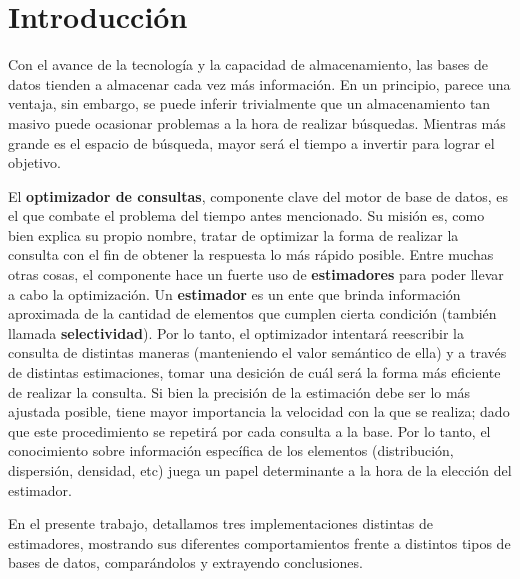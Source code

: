 \section{Introducción}


Con el avance de la tecnología y la capacidad de almacenamiento, las bases de datos tienden a almacenar cada vez más información. En un principio, parece una ventaja, sin embargo, se puede inferir trivialmente que un almacenamiento tan masivo puede ocasionar problemas a la hora de realizar búsquedas. Mientras más grande es el espacio de búsqueda, mayor será el tiempo a invertir para lograr el objetivo.

El \textbf{optimizador de consultas}, componente clave del motor de base de datos, es el que combate el problema del tiempo antes mencionado. Su misión es, como bien explica su propio nombre, tratar de optimizar la forma de realizar la consulta con el fin de obtener la respuesta lo más rápido posible. Entre muchas otras cosas, el componente hace un fuerte uso de \textbf{estimadores} para poder llevar a cabo la optimización. Un \textbf{estimador} es un {\Huge ente} que brinda información aproximada de la cantidad de elementos que cumplen cierta condición (también llamada \textbf{selectividad}). Por lo tanto, el optimizador intentará reescribir la consulta de distintas maneras (manteniendo el valor semántico de ella) y a través de distintas estimaciones, tomar una desición de cuál será la forma más eficiente de realizar la consulta. Si bien la precisión de la estimación debe ser lo más ajustada posible, tiene mayor importancia la velocidad con la que se realiza; dado que este procedimiento se repetirá por cada consulta a la base. Por lo tanto, el conocimiento sobre información específica de los elementos (distribución, dispersión, densidad, etc) juega un papel determinante a la hora de la elección del estimador.

En el presente trabajo, detallamos tres implementaciones distintas de estimadores, mostrando sus diferentes comportamientos frente a distintos tipos de bases de datos, comparándolos y extrayendo conclusiones. 


